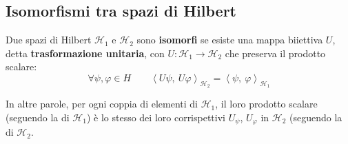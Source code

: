 \documentclass[FisicaTeorica.tex]{subfiles}
\begin{document}
\subsection{Isomorfismi tra spazi di Hilbert}
\begin{dfn}
Due spazi di Hilbert $\mathcal{H}_1$ e $\mathcal{H}_2$ sono \textbf{isomorfi} se esiste una mappa biiettiva $U$, detta \textbf{trasformazione unitaria}, con $U:\mathcal{H}_1\rightarrow\mathcal{H}_2$ che preserva il prodotto scalare:
\[
	\forall \psi, \varphi \in H \qquad \left\langle U\psi,\ U\varphi\right\rangle_{\mathcal{H}_2}=\left\langle\psi,\ \varphi\right\rangle_{\mathcal{H}_1}
\]
\end{dfn}
In altre parole, per ogni coppia di elementi di $\mathcal{H}_1$, il loro prodotto scalare (seguendo la  di $\mathcal{H}_1$) è lo stesso dei loro corrispettivi $U_\psi$, $U_\varphi$ in $\mathcal{H}_2$ (seguendo la  di $\mathcal{H}_2$.
\end{document}
